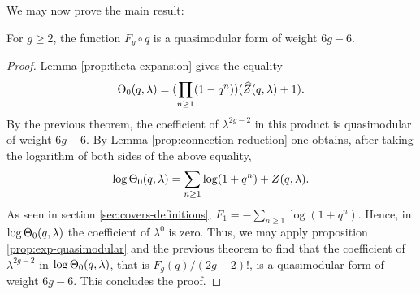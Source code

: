 We may now prove the main result:

\begin{thm}
 For $g\geq 2$, the function $F_g\circ q$ is a quasimodular form of weight $6g-6$.
\end{thm}
\begin{proof}
 Lemma \ref{prop:theta-expansion} gives the equality
 \[
  \Theta_0(q,\lambda)=(\prod_{n\geq 1}(1-q^n))(\widehat{Z}(q,\lambda)+1).
 \]
 By the previous theorem, the coefficient of $\lambda^{2g-2}$ in this product is quasimodular of weight $6g-6$. By Lemma \ref{prop:connection-reduction} one obtains, after taking the logarithm of both sides of the above equality,
 \[
  \log\Theta_0(q,\lambda)=\sum_{n\geq 1}\log(1+q^n) + Z(q,\lambda).
 \]
 As seen in section \ref{sec:covers-definitions}, $F_1=-\sum_{n\geq 1}\log(1+q^n)$. Hence, in $\log\Theta_0(q,\lambda)$ the coefficient of $\lambda^0$ is zero. Thus, we may apply proposition \ref{prop:exp-quasimodular} and the previous theorem to find that the coefficient of $\lambda^{2g-2}$ in $\log\Theta_0(q,\lambda)$, that is $F_g(q)/(2g-2)!$, is a quasimodular form of weight $6g-6$. This concludes the proof.
\end{proof}